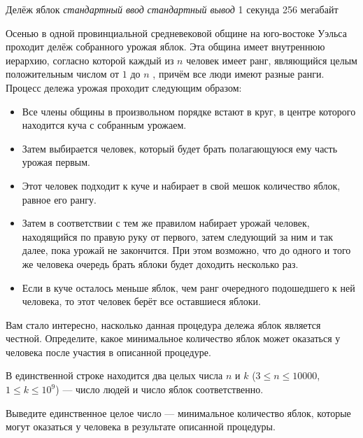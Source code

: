 \begin{problem}%
{Делёж яблок}%
{\textsl{стандартный ввод}}%
{\textsl{стандартный вывод}}%
{1 секунда}%
{256 мегабайт}{}

Осенью в одной провинциальной средневековой общине на юго-востоке Уэльса проходит делёж собранного урожая яблок. Эта община имеет внутреннюю иерархию, согласно которой каждый из $n$ человек имеет ранг, являющийся целым положительным числом от $1$ до $n$ , причём все люди имеют разные ранги.\\

Процесс дележа урожая проходит следующим образом:

\begin{itemize}
    \item Все члены общины в произвольном порядке встают в круг, в центре которого находится куча с собранным урожаем.
    \item Затем выбирается человек, который будет брать полагающуюся ему часть урожая первым.
    \item Этот человек подходит к куче и набирает в свой мешок количество яблок, равное его рангу.
    \item Затем в соответствии с тем же правилом набирает урожай человек, находящийся по правую руку от первого, затем следующий за ним и так далее, пока урожай не закончится. При этом возможно, что до одного и того же человека очередь брать яблоки будет доходить несколько раз.
    \item Если в куче осталось меньше яблок, чем ранг очередного подошедшего к ней человека, то этот человек берёт все оставшиеся яблоки.
\end{itemize}

Вам стало интересно, насколько данная процедура дележа яблок является честной. Определите, какое минимальное количество яблок может оказаться у человека после участия в описанной процедуре.

\InputFile

В единственной строке находится два целых числа $n$ и $k$ ($3 \le n \le 10000$, $1 \le k \le 10^9$) — число людей и число яблок соответственно.

\OutputFile

Выведите единственное целое число — минимальное количество яблок, которые могут оказаться у человека в результате описанной процедуры.

\Examples

\begin{example}
%
%
\end{example}


\end{problem}
